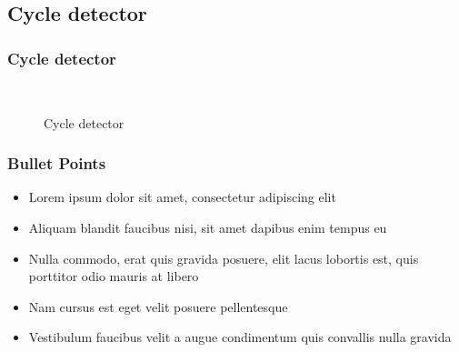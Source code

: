 \documentclass{beamer}
\begin{document}
\subsection{Cycle detector}
\begin{frame}
\frametitle{Cycle detector}
\begin{figure}[ht!]
     \begin{center}
%
       
        \\ %
        
%
    \end{center}
    \caption{%
        Cycle detector
     }%
   \label{fig:subfigures}
\end{figure}
\end{frame}


    

\begin{frame}
\frametitle{Bullet Points}
\begin{itemize}
\item Lorem ipsum dolor sit amet, consectetur adipiscing elit
\item Aliquam blandit faucibus nisi, sit amet dapibus enim tempus eu
\item Nulla commodo, erat quis gravida posuere, elit lacus lobortis est, quis porttitor odio mauris at libero
\item Nam cursus est eget velit posuere pellentesque
\item Vestibulum faucibus velit a augue condimentum quis convallis nulla gravida
\end{itemize}
\end{frame}

\end{document}
